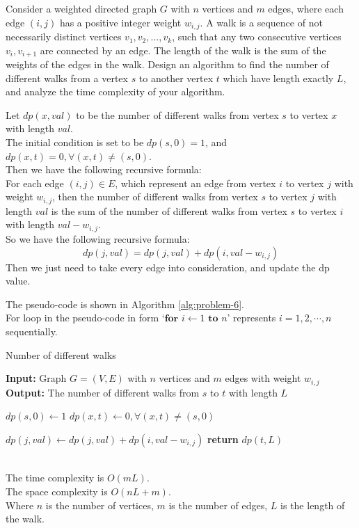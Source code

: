 \problem{}
Consider a weighted directed graph $G$ with $n$ vertices and $m$ edges, where each edge $(i,j)$ has a positive integer weight $w_{i, j}$. A  walk is a sequence of not necessarily distinct vertices $v_1, v_2, ..., v_k$, such that any two consecutive vertices $v_i, v_{i+1}$ are connected by an edge. The length of the walk is the sum of the weights of the edges in the walk.  Design an algorithm to find the number of different walks from a vertex $s$ to another vertex $t$ which have length exactly $L$, and analyze the time complexity of your algorithm. 

\solution{}

Let $dp(x, val)$ to be the number of different walks from vertex $s$ to vertex $x$ with length $val$.\\
The initial condition is set to be $dp(s,0)=1$, and $dp(x,t)=0, \forall (x,t)\neq (s,0)$.\\
Then we have the following recursive formula:\\
For each edge $(i,j)\in E$, which represent an edge from vertex $i$ to vertex $j$ with weight $w_{i,j}$, then the number of different walks from vertex $s$ to vertex $j$ with length $val$ is the sum of the number of different walks from vertex $s$ to vertex $i$ with length $val-w_{i,j}$.\\
So we have the following recursive formula:
$$dp(j,val) = dp(j,val)+dp(i, val-w_{i,j})$$
Then we just need to take every edge into consideration, and update the dp value.

The pseudo-code is shown in Algorithm \ref{alg:problem-6}.\\
For loop in the pseudo-code in form `$\textbf{for } i \gets 1 \textbf{ to } n$' represents $i=1,2,\cdots,n$ sequentially.
\begin{algorithm}
    \caption{Number of different walks}
    \begin{algorithmic}[1]
    \State \textbf{Input:} Graph $G=(V,E)$ with $n$ vertices and $m$ edges with weight $w_{i,j}$
    \State \textbf{Output:} The number of different walks from $s$ to $t$ with length $L$
    
    \State $dp(s,0) \gets 1$
    \State $dp(x,t) \gets 0, \forall (x,t)\neq (s,0)$
    
                \State $dp(j,val) \gets dp(j,val)+dp(i, val-w_{i,j})$
            \EndIf
        \EndFor
    \EndFor
    \State \textbf{return} $dp(t,L)$
    \end{algorithmic}
    \label{alg:problem-6}
\end{algorithm}\\
The time complexity is $O(mL)$.\\
The space complexity is $O(nL+m)$.\\
Where $n$ is the number of vertices, $m$ is the number of edges, $L$ is the length of the walk.\\
